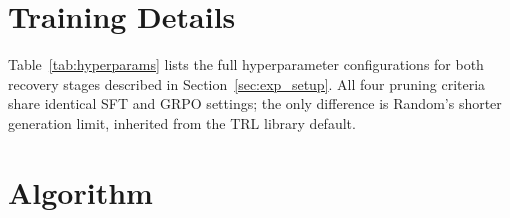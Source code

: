 \section{Training Details}
\label{sec:appendix_training}

Table~\ref{tab:hyperparams} lists the full hyperparameter configurations for both recovery stages described in Section~\ref{sec:exp_setup}. All four pruning criteria share identical SFT and GRPO settings; the only difference is Random's shorter generation limit, inherited from the TRL library default.

\begin{table}[h]
\centering
\small
\caption{Hyperparameter details for SFT warmup and GRPO recovery stages. All methods share the same GRPO configuration; Random uses the TRL default generation limit (marked with $^\dagger$).}
\label{tab:hyperparams}
\end{table}

\section{Algorithm}
\label{sec:appendix_algo}

